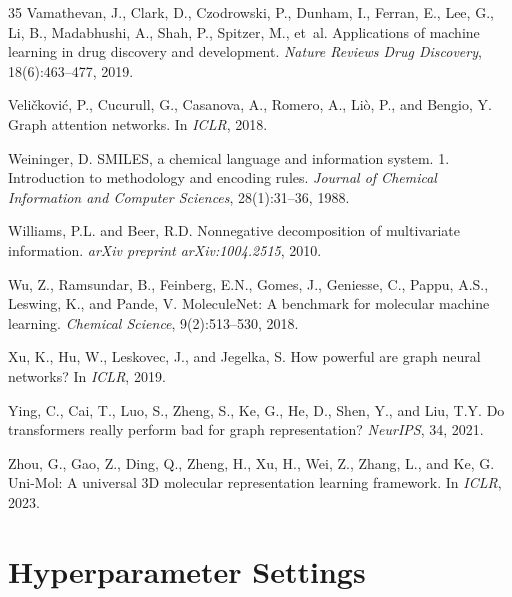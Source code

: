 \documentclass[11pt]{article}
\begin{document}
\begin{thebibliography}{35}
Vamathevan, J., Clark, D., Czodrowski, P., Dunham, I., Ferran, E., Lee, G., Li, B., Madabhushi, A., Shah, P., Spitzer, M., et~al.
\newblock Applications of machine learning in drug discovery and development.
\newblock \emph{Nature Reviews Drug Discovery}, 18(6):463--477, 2019.

Veli{\v{c}}kovi{\'c}, P., Cucurull, G., Casanova, A., Romero, A., Li{\`o}, P., and Bengio, Y.
\newblock Graph attention networks.
\newblock In \emph{ICLR}, 2018.

Weininger, D.
\newblock SMILES, a chemical language and information system. 1. Introduction to methodology and encoding rules.
\newblock \emph{Journal of Chemical Information and Computer Sciences}, 28(1):31--36, 1988.

Williams, P.L. and Beer, R.D.
\newblock Nonnegative decomposition of multivariate information.
\newblock \emph{arXiv preprint arXiv:1004.2515}, 2010.

Wu, Z., Ramsundar, B., Feinberg, E.N., Gomes, J., Geniesse, C., Pappu, A.S., Leswing, K., and Pande, V.
\newblock MoleculeNet: A benchmark for molecular machine learning.
\newblock \emph{Chemical Science}, 9(2):513--530, 2018.

Xu, K., Hu, W., Leskovec, J., and Jegelka, S.
\newblock How powerful are graph neural networks?
\newblock In \emph{ICLR}, 2019.

Ying, C., Cai, T., Luo, S., Zheng, S., Ke, G., He, D., Shen, Y., and Liu, T.Y.
\newblock Do transformers really perform bad for graph representation?
\newblock \emph{NeurIPS}, 34, 2021.

Zhou, G., Gao, Z., Ding, Q., Zheng, H., Xu, H., Wei, Z., Zhang, L., and Ke, G.
\newblock Uni-Mol: A universal 3D molecular representation learning framework.
\newblock In \emph{ICLR}, 2023.

\end{thebibliography}

\newpage
\appendix

\section{Hyperparameter Settings}
\label{app:hyperparams}
\end{document}
